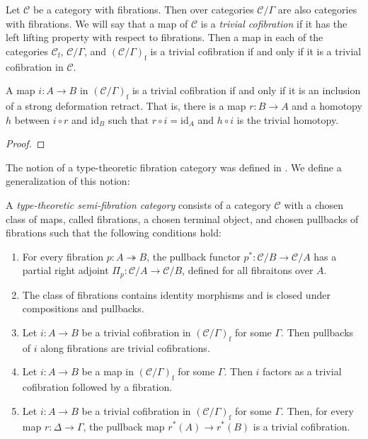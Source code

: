 \documentclass[reqno]{amsart}
\theoremstyle{definition}
\theoremstyle{remark}
\newcommand{\fs}[1]{\mathrm{#1}}
\newcommand{\scat}[1]{\mathcal{#1}}
\newcommand{\id}{\fs{id}}
\numberwithin{figure}{section}
\begin{document}
Let $\scat{C}$ be a category with fibrations.
Then over categories $\scat{C}/\Gamma$ are also categories with fibrations.
We will say that a map of $\scat{C}$ is a \emph{trivial cofibration} if it has the left lifting property with respect to fibrations.
Then a map in each of the categories $\scat{C}_\fs{f}$, $\scat{C}/\Gamma$, and $(\scat{C}/\Gamma)_\fs{f}$ is a trivial cofibration if and only if it is a trivial cofibration in $\scat{C}$.

\begin{prop}
A map $i : A \to B$ in $(\scat{C}/\Gamma)_\fs{f}$ is a trivial cofibration if and only if it is an inclusion of a strong deformation retract.
That is, there is a map $r : B \to A$ and a homotopy $h$ between $i \circ r$ and $\id_B$ such that $r \circ i = \id_A$ and $h \circ i$ is the trivial homotopy.
\end{prop}
\begin{proof}
\end{proof}

The notion of a type-theoretic fibration category was defined in \cite[Definition~2.1]{shul-inv}.
We define a generalization of this notion:
\begin{defn}[ttsfc]
A \emph{type-theoretic semi-fibration category} consists of a category $\scat{C}$ with a chosen class of maps, called fibrations, a chosen terminal object, and chosen pullbacks of fibrations such that the following conditions hold:
\begin{enumerate}
\item \label{it:ttsfc-pi} For every fibration $p : A \twoheadrightarrow B$, the pullback functor $p^* : \scat{C}/B \to \scat{C}/A$ has a partial right adjoint $\Pi_p : \scat{C}/A \to \scat{C}/B$, defined for all fibraitons over $A$.
\item The class of fibrations contains identity morphisms and is closed under compositions and pullbacks.
\item Let $i : A \to B$ be a trivial cofibration in $(\scat{C}/\Gamma)_\fs{f}$ for some $\Gamma$.
Then pullbacks of $i$ along fibrations are trivial cofibrations.
\item \label{it:ttsfc-factor} Let $i : A \to B$ be a map in $(\scat{C}/\Gamma)_\fs{f}$ for some $\Gamma$.
Then $i$ factors as a trivial cofibration followed by a fibration.
\item Let $i : A \to B$ be a trivial cofibration in $(\scat{C}/\Gamma)_\fs{f}$ for some $\Gamma$.
Then, for every map $r : \Delta \to \Gamma$, the pullback map $r^*(A) \to r^*(B)$ is a trivial cofibration.
\end{enumerate}
\end{defn}
\end{document}
